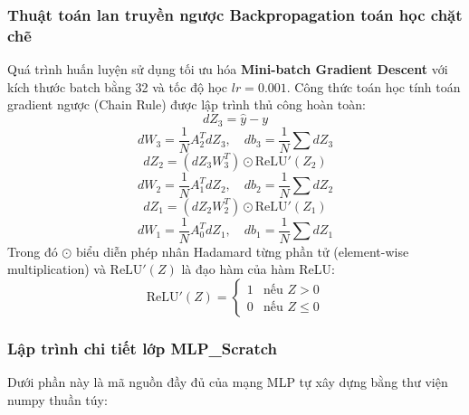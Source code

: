\documentclass[a4paper]{article}
\begin{document}
\subsubsection{Thuật toán lan truyền ngược Backpropagation toán học chặt chẽ}
Quá trình huấn luyện sử dụng tối ưu hóa \textbf{Mini-batch Gradient Descent} với kích thước batch bằng 32 và tốc độ học $lr=0.001$. Công thức toán học tính toán gradient ngược (Chain Rule) được lập trình thủ công hoàn toàn:
\begin{equation}
    dZ_3 = \hat{y} - y
\end{equation}
\begin{equation}
    dW_3 = \frac{1}{N} A_2^T dZ_3, \quad db_3 = \frac{1}{N} \sum dZ_3
\end{equation}
\begin{equation}
    dZ_2 = (dZ_3 W_3^T) \odot \text{ReLU}'(Z_2)
\end{equation}
\begin{equation}
    dW_2 = \frac{1}{N} A_1^T dZ_2, \quad db_2 = \frac{1}{N} \sum dZ_2
\end{equation}
\begin{equation}
    dZ_1 = (dZ_2 W_2^T) \odot \text{ReLU}'(Z_1)
\end{equation}
\begin{equation}
    dW_1 = \frac{1}{N} A_0^T dZ_1, \quad db_1 = \frac{1}{N} \sum dZ_1
\end{equation}
Trong đó $\odot$ biểu diễn phép nhân Hadamard từng phần tử (element-wise multiplication) và $\text{ReLU}'(Z)$ là đạo hàm của hàm ReLU:
\begin{equation}
    \text{ReLU}'(Z) = 
    \begin{cases} 
        1 & \text{nếu } Z > 0 \\ 
        0 & \text{nếu } Z \leq 0 
    \end{cases}
\end{equation}

\subsubsection{Lập trình chi tiết lớp MLP\_Scratch}
Dưới phần này là mã nguồn đầy đủ của mạng MLP tự xây dựng bằng thư viện numpy thuần túy:
\end{document}
